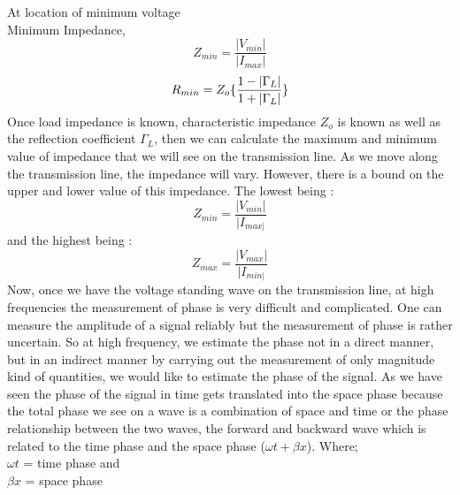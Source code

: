 	At location of minimum voltage\\
	Minimum Impedance,
	\begin{equation}
	Z_{min}=\frac{|V_{min}|}{|I_{max}|}
	\end{equation}
	\begin{equation}
	\\R_{min} =Z_o\{\frac{1-|\Gamma_L|}{1+|\Gamma_L|}\}
	\end{equation}
	Once load impedance is known, characteristic impedance $Z_o$ is known as well as the reflection coefficient $\Gamma_L$, then we can calculate the maximum and minimum value of impedance that we will see on the transmission line. As we move along the transmission line, the impedance will vary. However, there is a bound on the upper and lower value of this impedance. The lowest being :
	\begin{equation*}
	Z_{min} = \frac{|V_{min}|}{|I_{max|}}
	\end{equation*}
	and the highest being :
	\begin{equation*}
	Z_{max} = \frac{|V_{max}|}{|I_{min|}}
	\end{equation*}
Now, once we have the voltage standing wave on the transmission line, at high frequencies the measurement of phase is very difficult and complicated. One can measure the amplitude of a signal reliably but the measurement of phase is rather uncertain. So at high frequency, we estimate the phase not in a direct manner, but in an indirect manner by carrying out the measurement of only magnitude kind of quantities, we would like to estimate the phase of the signal. As we have seen the phase of the signal in time gets translated into the space phase because the total phase we see on a wave is a combination of space and time or the phase relationship between the two waves, the forward and backward wave which is related to the time phase and the space phase ($\omega t + \beta x$). Where;
	\\ $\omega t$ = time phase and 
	\\ $\beta x$ = space phase
